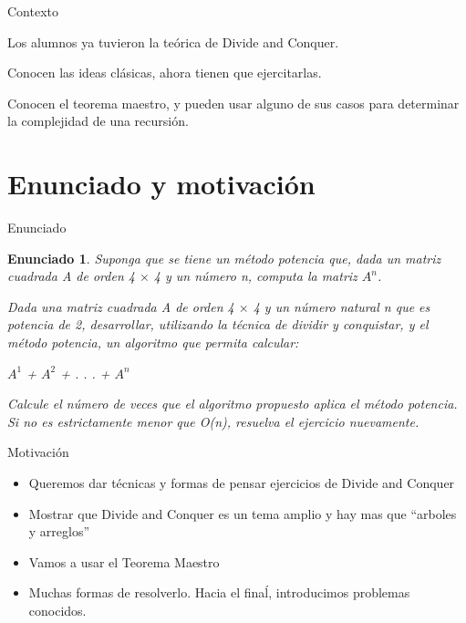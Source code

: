 \documentclass[pdf]{beamer}
\newcommand{\quotes}[1]{``#1''}
\newtheorem{enun}{Enunciado}
\begin{document}
\begin{frame}{Contexto}
    \par{Los alumnos ya tuvieron la teórica de Divide and Conquer. }
    \vspace{2em}
	
    \par{Conocen las ideas clásicas, ahora tienen que ejercitarlas.}
    \vspace{2em}
	
    \par{Conocen el teorema maestro, y pueden usar alguno de sus casos para determinar 
    la complejidad de una recursión.}
\end{frame}

\section{Enunciado y motivación}

\begin{frame}{Enunciado}

\begin{enun}
    \par{Suponga que se tiene un método potencia que, dada un matriz cuadrada A de orden 4 $\times$ 4 
    y un número n, computa la matriz $A^n$.} 
    \vspace{0.5em}
    \par{Dada una matriz cuadrada A de orden 4 $\times$ 4 y un número natural n que es potencia de 2, 
    desarrollar, utilizando la técnica de dividir y conquistar, y el método potencia,
un algoritmo que permita calcular: }
    \vspace{0.5em}
    
    \begin{center}
        $A^1$ + $A^2$ + . . . + $A^n$
    \end{center}

    \vspace{0.5em}
    
    \par{Calcule el número de veces que el algoritmo propuesto aplica el método potencia. Si no es estrictamente menor que O(n), 
resuelva el ejercicio nuevamente.}
\end{enun}

\end{frame}

\begin{frame}{Motivación}
    \begin{itemize}
        \item Queremos dar técnicas y formas de pensar ejercicios de Divide and Conquer
        \item Mostrar que Divide and Conquer es un tema amplio y hay mas que \quotes{arboles y arreglos}
        \item Vamos a usar el Teorema Maestro
        \item Muchas formas de resolverlo. Hacia el finaĺ, introducimos problemas conocidos. 
    \end{itemize}
\end{frame}
\end{document}
